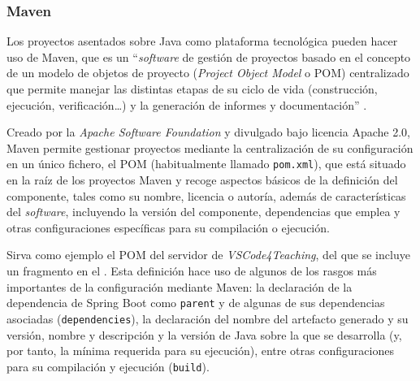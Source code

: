 \subsubsection{Maven}
\label{subsec:tecMaven}
Los proyectos asentados sobre Java como plataforma tecnológica pueden hacer uso de Maven, que es un ``\textit{software} de gestión de proyectos basado en el concepto de un modelo de objetos de proyecto (\textit{Project Object Model} o POM) centralizado que permite manejar las distintas etapas de su ciclo de vida (construcción, ejecución, verificación\dots) y la generación de informes y documentación'' \cite{Maven}.

Creado por la \textit{Apache Software Foundation} y divulgado bajo licencia Apache 2.0, Maven permite gestionar proyectos mediante la centralización de su configuración en un único fichero, el POM (habitualmente llamado \texttt{pom.xml}), que está situado en la raíz de los proyectos Maven y recoge aspectos básicos de la definición del componente, tales como su nombre, licencia o autoría, además de características del \textit{software}, incluyendo la versión del componente, dependencias que emplea y otras configuraciones específicas para su compilación o ejecución.

Sirva como ejemplo el POM del servidor de \textit{VSCode4Teaching}, del que se incluye un fragmento en el . Esta definición hace uso de algunos de los rasgos más importantes de la configuración mediante Maven: la declaración de la dependencia de Spring Boot como \texttt{parent} y de algunas de sus dependencias asociadas (\texttt{dependencies}), la declaración del nombre del artefacto generado y su versión, nombre y descripción y la versión de Java sobre la que se desarrolla (y, por tanto, la mínima requerida para su ejecución), entre otras configuraciones para su compilación y ejecución (\texttt{build}).

